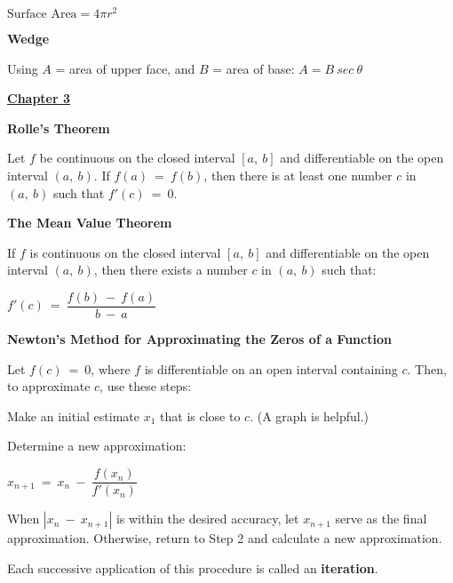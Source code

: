 \documentclass{article}
\begin{document}
\begin{large}
\hspace{0.1in} $\text{Surface Area} = 4\pi r^{2}$

\textbf{Wedge}

\hspace{0.1in} Using $A$ = area of upper face, and $B$ = area of base: $A = B\ sec\ \theta$

\newpage


\vspace{0.25in}

\underline{\textbf{\huge Chapter 3 \phantom{ } \phantom{ } \phantom{ } \phantom{ }}}

\textbf{Rolle's Theorem}

\hspace{0.1in} Let $f$ be continuous on the closed interval $[a,\ b]$ and differentiable on the open interval $(a,\ b)$.  If $f(a)\ =\ f(b)$, then there is at least one number $c$ in $(a,\ b)$ such that $f'(c)\ =\ 0$.

\textbf{The Mean Value Theorem}

\hspace{0.1in} If $f$ is continuous on the closed interval $[a,\ b]$ and differentiable on the open interval $(a,\ b)$, then there exists a number $c$ in $(a,\ b)$ such that:

\hspace{2.2in} $f'(c)\ =\ \dfrac{f(b)\ -\ f(a)}{b\ -\ a}$

\textbf{Newton's Method for Approximating the Zeros of a Function}

\hspace{0.1in} Let $f(c)\ =\ 0$, where $f$ is differentiable on an open interval containing $c$.  Then, to approximate $c$, use these steps:

\hspace{0.2in} Make an initial estimate $x_{1}$ that is close to $c$. (A graph is helpful.)

\hspace{0.2in} Determine a new approximation:

\hspace{2.5in} $x_{n+1}\ =\ x_{n}\ -\ \dfrac{f(x_{n})}{f'(x_{n})}$

\hspace{0.2in} When $|x_{n}\ -\ x_{n+1}|$ is within the desired accuracy, let $x_{n+1}$ serve as the final approximation.  Otherwise, return to Step 2 and calculate a new approximation.

\hspace{0.1in} Each successive application of this procedure is called an \textbf{iteration}.


\end{large}
\end{document}
